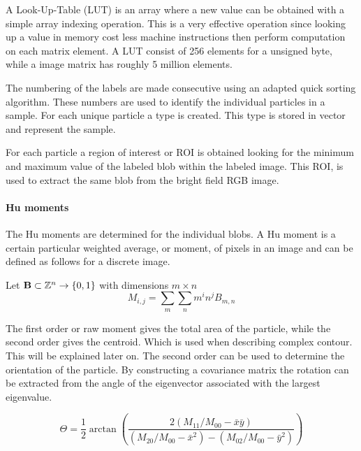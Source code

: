 \documentclass[11pt,fleqn,,a4paper,twoside,openright]{book}
\begin{document}
\begin{remark}
	A Look-Up-Table (LUT) is an array where a new value can be obtained with a simple array indexing operation. This is a very effective operation since looking up a value in memory cost less machine instructions then perform computation on each matrix element. A LUT consist of 256 elements for a unsigned byte, while a image matrix has roughly 5 million elements.
\end{remark}

The numbering of the labels are made consecutive using an adapted quick sorting algorithm. These numbers are used to identify the individual particles in a sample. For each unique particle a type is created. This type is stored in vector and represent the sample.

For each particle a region of interest or ROI is obtained looking for the minimum and maximum value of the labeled blob within the labeled image. This ROI, is used to extract the same blob from the bright field RGB image.

\paragraph{Hu moments}\label{Hu moments}
The Hu moments are determined for the individual blobs. A Hu moment is a certain particular weighted average, or moment, of pixels in an image and can be defined as follows for a discrete image.
\begin{sBox}
	Let $\mat{B} \subset \mathbb{Z}^n \rightarrow \{0, 1\}$ with dimensions $ m \times n $
	\begin{equation}\label{eq:humoment}
		M_{i,j}=\sum_m \sum_n m^i n^j B_{m,n}
	\end{equation}
\end{sBox}
The first order or raw moment gives the total area of the particle, while the second order gives the centroid. Which is used when describing complex contour. This will be explained later on. The second order can be used to determine the orientation of the particle. By constructing a covariance matrix the rotation can be extracted from the angle of the eigenvector associated with the largest eigenvalue.
\begin{sBox}
	\begin{equation}
	\Theta = \frac{1}{2} \arctan \left( \frac{2 (M_{11}/M_{00} - \bar{x}\bar{y})}{(M_{20}/M_{00} - \bar{x}^2) - (M_{02}/M_{00} - \bar{y}^2)} \right)
	\end{equation}
\end{sBox}
\end{document}
